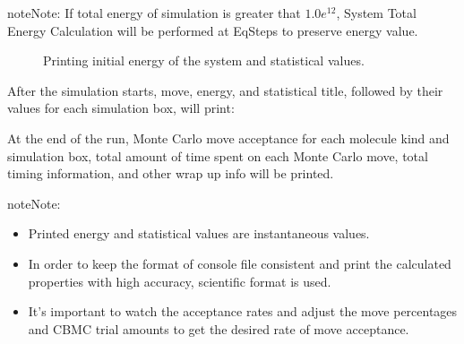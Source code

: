 \documentclass[letterpaper,10pt,english]{sphinxmanual}
\begin{document}
\begin{sphinxadmonition}{note}{Note:}
If total energy of simulation is greater that \(1.0e^{12}\), System Total Energy
Calculation will be performed at EqSteps to preserve energy value.
\end{sphinxadmonition}

\begin{figure}[htbp]
\centering
\capstart

\noindent{}
\caption{Printing initial energy of the system and statistical values.}\label{\detokenize{output_file:id4}}\end{figure}

After the simulation starts, move, energy, and statistical title, followed by their values for each simulation box, will print:

\begin{figure}[htbp]
\centering

\noindent{}
\end{figure}

At the end of the run, Monte Carlo move acceptance for each molecule kind and simulation box, total amount of time spent on each
Monte Carlo move, total timing information, and other wrap up info will be printed.

\begin{sphinxadmonition}{note}{Note:}\begin{itemize}
\item {} 
Printed energy and statistical values are instantaneous values.

\item {} 
In order to keep the format of console file consistent and print the calculated properties with high accuracy, scientific format is used.

\item {} 
It’s important to watch the acceptance rates and adjust the move percentages and CBMC trial amounts to get the desired rate of move acceptance.

\end{itemize}
\end{sphinxadmonition}
\end{document}
